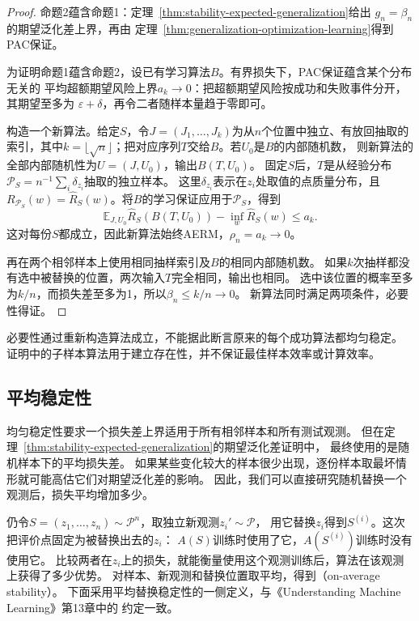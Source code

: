 \begin{proof}
命题2蕴含命题1：定理~\ref{thm:stability-expected-generalization}给出
$g_n=\beta_n$的期望泛化差上界，再由
定理~\ref{thm:generalization-optimization-learning}得到PAC保证。

为证明命题1蕴含命题2，设已有学习算法$B$。有界损失下，PAC保证蕴含某个分布无关的
平均超额期望风险上界$a_k\to0$：把超额期望风险按成功和失败事件分开，其期望至多为
$\varepsilon+\delta$，再令二者随样本量趋于零即可。

构造一个新算法。给定$S$，令$J=(J_1,\ldots,J_k)$为从$n$个位置中独立、有放回抽取的
索引，其中$k=\lfloor\sqrt n\rfloor$；把对应序列$T$交给$B$。若$U_0$是$B$的内部随机数，
则新算法的全部内部随机性为$U=(J,U_0)$，输出$B(T,U_0)$。
固定$S$后，$T$是从经验分布$\mathcal P_S=n^{-1}\sum_i\delta_{z_i}$抽取的独立样本。
这里$\delta_{z_i}$表示在$z_i$处取值的点质量分布，且
$R_{\mathcal P_S}(w)=\hat R_S(w)$。将$B$的学习保证应用于$\mathcal P_S$，得到
\[
 \mathbb E_{J,U_0}\hat R_S(B(T,U_0))-\inf_w\hat R_S(w)\leq a_k.
\]
这对每份$S$都成立，因此新算法始终AERM，$\rho_n=a_k\to0$。

再在两个相邻样本上使用相同抽样索引及$B$的相同内部随机数。
如果$k$次抽样都没有选中被替换的位置，两次输入$T$完全相同，输出也相同。
选中该位置的概率至多为$k/n$，而损失差至多为1，所以$\beta_n\leq k/n\to0$。
新算法同时满足两项条件，必要性得证。
\end{proof}

必要性通过重新构造算法成立，不能据此断言原来的每个成功算法都均匀稳定。
证明中的子样本算法用于建立存在性，并不保证最佳样本效率或计算效率。

\subsection{平均稳定性}
\label{sec:on-average-stability}

均匀稳定性要求一个损失差上界适用于所有相邻样本和所有测试观测。
但在定理~\ref{thm:stability-expected-generalization}的期望泛化差证明中，
最终使用的是随机样本下的平均损失差。
如果某些变化较大的样本很少出现，逐份样本取最坏情形就可能高估它们对期望泛化差的影响。
因此，我们可以直接研究随机替换一个观测后，损失平均增加多少。

仍令$S=(z_1,\ldots,z_n)\sim\mathcal P^n$，取独立新观测$z_i'\sim\mathcal P$，
用它替换$z_i$得到$S^{(i)}$。这次把评价点固定为被替换出去的$z_i$：
$A(S)$训练时使用了它，$A(S^{(i)})$训练时没有使用它。
比较两者在$z_i$上的损失，就能衡量使用这个观测训练后，算法在该观测上获得了多少优势。
对样本、新观测和替换位置取平均，得到（on-average stability）。
下面采用平均替换稳定性的一侧定义，与《Understanding Machine Learning》第13章中的
约定一致。

